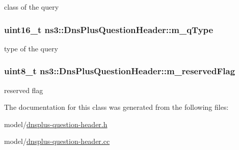 class of the query 

\hypertarget{classns3_1_1DnsPlusQuestionHeader_a9ec3c28da5e22b33bccb1406ba053876}{
\subsubsection[{m\-\_\-q\-Type}]{\setlength{\rightskip}{0pt plus 5cm}uint16\-\_\-t ns3\-::\-Dns\-Plus\-Question\-Header\-::m\-\_\-q\-Type\hspace{0.3cm}{\ttfamily [private]}}}\label{classns3_1_1DnsPlusQuestionHeader_a9ec3c28da5e22b33bccb1406ba053876}


type of the query 

\hypertarget{classns3_1_1DnsPlusQuestionHeader_a84e44f8fa45c27b13bd7a80ab4d3c648}{
\subsubsection[{m\-\_\-reserved\-Flag}]{\setlength{\rightskip}{0pt plus 5cm}uint8\-\_\-t ns3\-::\-Dns\-Plus\-Question\-Header\-::m\-\_\-reserved\-Flag\hspace{0.3cm}{\ttfamily [private]}}}\label{classns3_1_1DnsPlusQuestionHeader_a84e44f8fa45c27b13bd7a80ab4d3c648}


reserved flag 



The documentation for this class was generated from the following files\-:\begin{DoxyCompactItemize}
\item 
model/\hyperlink{dnsplus-question-header_8h}{dnsplus-\/question-\/header.\-h}\item 
model/\hyperlink{dnsplus-question-header_8cc}{dnsplus-\/question-\/header.\-cc}\end{DoxyCompactItemize}
